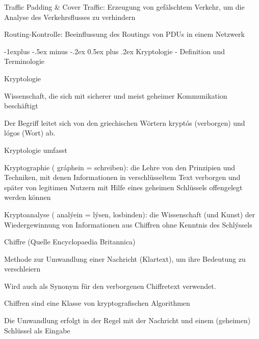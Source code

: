 \documentclass[a4paper]{article}
\makeatletter
\renewcommand{\subsection}{\@startsection{subsection}{2}{0mm}%
 {-1explus -.5ex minus -.2ex}%
 {0.5ex plus .2ex}%
 {\normalfont\normalsize\bfseries}}
\makeatother
\begin{document}
\begin{multicols}{3}
\begin{itemize*}
            \begin{itemize*}
                  \item Traffic Padding \& Cover Traffic: Erzeugung von gefälschtem Verkehr, um die Analyse des Verkehrsflusses zu verhindern
                  \item Routing-Kontrolle: Beeinflussung des Routings von PDUs in einem Netzwerk
            \end{itemize*}
      \end{itemize*}


      \subsection{Kryptologie - Definition und
            Terminologie}

      \begin{itemize*}
            \item
            Kryptologie

            \begin{itemize*}
                  \item Wissenschaft, die sich mit sicherer und meist geheimer Kommunikation beschäftigt
                  \item Der Begriff leitet sich von den griechischen Wörtern kryptós (verborgen) und lógos (Wort) ab.
                  \item Kryptologie umfasst
                  \begin{itemize*} \item Kryptographie ( gráphein = schreiben): die Lehre von den Prinzipien und Techniken, mit denen Informationen in verschlüsseltem Text verborgen und später von legitimen Nutzern mit Hilfe eines geheimen Schlüssels offengelegt werden können \item Kryptoanalyse ( analýein = lýsen, losbinden): die Wissenschaft (und Kunst) der Wiedergewinnung von Informationen aus Chiffren ohne Kenntnis des Schlýssels \end{itemize*}
            \end{itemize*}
            \item
            Chiffre (Quelle Encyclopaedia Britannica)

            \begin{itemize*}
                  \item Methode zur Umwandlung einer Nachricht (Klartext), um ihre Bedeutung zu verschleiern
                  \item Wird auch als Synonym für den verborgenen Chiffretext verwendet.
                  \item Chiffren sind eine Klasse von kryptografischen Algorithmen
                  \item Die Umwandlung erfolgt in der Regel mit der Nachricht und einem (geheimen) Schlüssel als Eingabe
            \end{itemize*}
      \end{itemize*}



\end{multicols}
\end{document}
